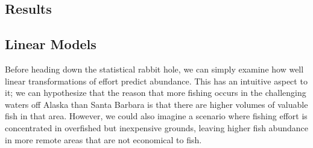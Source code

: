 \documentclass[twoside,12pt,final]{ucthesis-CA2012}
\begin{document}
\begin{ucmainmatter}
\section{Results}\label{results}

\subsection{Linear Models}\label{linear-models-1}

Before heading down the statistical rabbit hole, we can simply examine
how well linear transformations of effort predict abundance. This has an
intuitive aspect to it; we can hypothesize that the reason that more
fishing occurs in the challenging waters off Alaska than Santa Barbara
is that there are higher volumes of valuable fish in that area. However,
we could also imagine a scenario where fishing effort is concentrated in
overfished but inexpensive grounds, leaving higher fish abundance in
more remote areas that are not economical to fish.


\end{ucmainmatter}
\end{document}
